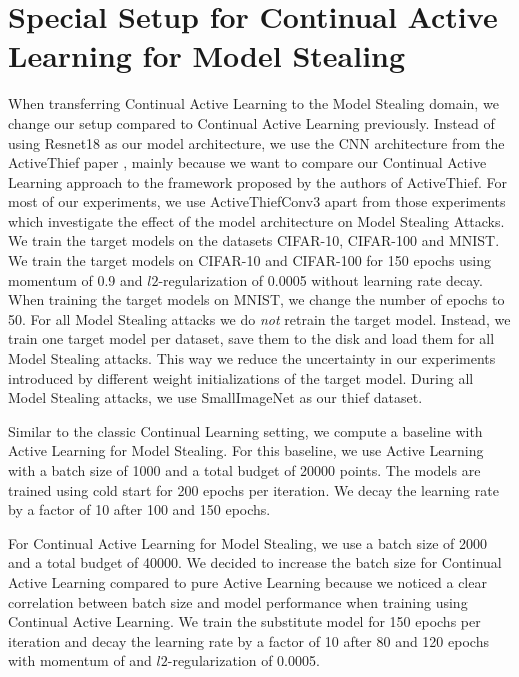 \section{Special Setup for Continual Active Learning for Model Stealing}
\label{sec:Methodology:CALMSsetup}
When transferring Continual Active Learning to the Model Stealing domain, we change our setup compared to Continual Active Learning previously. Instead of using Resnet18 as our
model architecture, we use the CNN architecture from the ActiveThief paper \cite{pal2020activethief}, mainly because we want to compare our Continual Active Learning approach to
the framework proposed by the authors of ActiveThief. For most of our experiments, we use ActiveThiefConv3 apart from those experiments which investigate the effect of the model 
architecture on Model Stealing Attacks. We train the target models on the datasets CIFAR-10, CIFAR-100 and MNIST. We train the target models on CIFAR-10 and CIFAR-100 for
150 epochs using momentum of 0.9 and $l2$-regularization of 0.0005 without learning rate decay. When training the target models on MNIST, we change the number of epochs to 50.
For all Model Stealing attacks we do \textit{not} retrain the target model. Instead, we train one target model per dataset, save them to the disk and load them for all Model Stealing
attacks. This way we reduce the uncertainty in our experiments introduced by different weight initializations of the target model. During all Model Stealing attacks, we use SmallImageNet
as our thief dataset. \par
Similar to the classic Continual Learning setting, we compute a baseline with Active Learning for Model Stealing. For this baseline, we use Active Learning with a batch size of 1000
and a total budget of 20000 points. The models are trained using cold start for 200 epochs per iteration. We decay the learning rate by a factor of 10 after 100 and 150 epochs. \par
For Continual Active Learning for Model Stealing, we use a batch size of 2000 and a total budget of 40000. We decided to increase the batch size for Continual Active Learning compared
to pure Active Learning because we noticed a clear correlation between batch size and model performance when training using Continual Active Learning. We train the substitute model for
150 epochs per iteration and decay the learning rate by a factor of 10 after 80 and 120 epochs with momentum of and $l2$-regularization of 0.0005.
